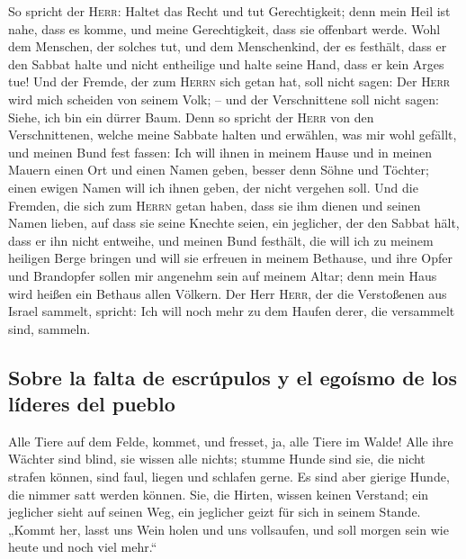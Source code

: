  So spricht der \textsc{Herr}: Haltet das Recht und tut
Gerechtigkeit; denn mein Heil ist nahe, dass es komme, und meine
Gerechtigkeit, dass sie offenbart werde.  Wohl dem
Menschen, der solches tut, und dem Menschenkind, der es festhält, dass
er den Sabbat halte und nicht entheilige und halte seine Hand, dass er
kein Arges tue!  Und der Fremde, der zum \textsc{Herrn}
sich getan hat, soll nicht sagen: Der \textsc{Herr} wird mich scheiden
von seinem Volk; -- und der Verschnittene soll nicht sagen: Siehe, ich
bin ein dürrer Baum.  Denn so spricht der \textsc{Herr}
von den Verschnittenen, welche meine Sabbate halten und erwählen, was
mir wohl gefällt, und meinen Bund fest fassen:  Ich will
ihnen in meinem Hause und in meinen Mauern einen Ort und einen Namen
geben, besser denn Söhne und Töchter; einen ewigen Namen will ich ihnen
geben, der nicht vergehen soll.  Und die Fremden, die sich
zum \textsc{Herrn} getan haben, dass sie ihm dienen und seinen Namen
lieben, auf dass sie seine Knechte seien, ein jeglicher, der den Sabbat
hält, dass er ihn nicht entweihe, und meinen Bund festhält,
 die will ich zu meinem heiligen Berge bringen und will
sie erfreuen in meinem Bethause, und ihre Opfer und Brandopfer sollen
mir angenehm sein auf meinem Altar; denn mein Haus wird heißen ein
Bethaus allen Völkern.  Der Herr \textsc{Herr}, der die
Verstoßenen aus Israel sammelt, spricht: Ich will noch mehr zu dem
Haufen derer, die versammelt sind, sammeln.

\hypertarget{sobre-la-falta-de-escruxfapulos-y-el-egouxedsmo-de-los-luxedderes-del-pueblo}{%
\subsection{Sobre la falta de escrúpulos y el egoísmo de los líderes del
pueblo}\label{sobre-la-falta-de-escruxfapulos-y-el-egouxedsmo-de-los-luxedderes-del-pueblo}}

 Alle Tiere auf dem Felde, kommet, und fresset, ja, alle
Tiere im Walde!  Alle ihre Wächter sind blind, sie wissen
alle nichts; stumme Hunde sind sie, die nicht strafen können, sind faul,
liegen und schlafen gerne.  Es sind aber gierige Hunde,
die nimmer satt werden können. Sie, die Hirten, wissen keinen Verstand;
ein jeglicher sieht auf seinen Weg, ein jeglicher geizt für sich in
seinem Stande.  „Kommt her, lasst uns Wein holen und uns
vollsaufen, und soll morgen sein wie heute und noch viel mehr.``

